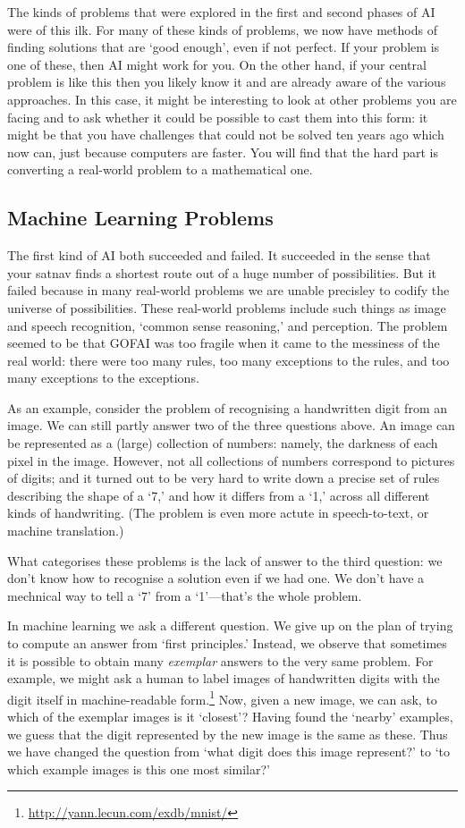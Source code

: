 \documentclass[10pt, a4paper, twocolumn]{article}
\begin{document}
The kinds of problems that were explored in the first and second phases of AI
were of this ilk. For many of these kinds of problems, we now have methods of
finding solutions that are `good enough', even if not perfect. If your problem
is one of these, then AI might work for you. On the other hand, if your central
problem is like this then you likely know it and are already aware of the
various approaches. In this case, it might be interesting to look at other
problems you are facing and to ask whether it could be possible to cast them
into this form: it might be that you have challenges that could not be solved
ten years ago which now can, just because computers are faster. You will find
that the hard part is converting a real-world problem to a mathematical one.


\subsection{Machine Learning Problems}

The first kind of AI both succeeded and failed. It succeeded in the sense that
your satnav finds a shortest route out of a huge number of possibilities. But it
failed because in many real-world problems we are unable precisley to codify the
universe of possibilities. These real-world problems include such things as
image and speech recognition, `common sense reasoning,' and perception. The
problem seemed to be that GOFAI was too fragile when it came to the messiness of
the real world: there were too many rules, too many exceptions to the rules, and
too many exceptions to the exceptions.

As an example, consider the problem of recognising a handwritten digit from an
image. We can still partly answer two of the three questions above. An image can
be represented as a (large) collection of numbers: namely, the darkness of each
pixel in the image. However, not all collections of numbers correspond to
pictures of digits; and it turned out to be very hard to write down a precise
set of rules describing the shape of a `7,' and how it differs from a `1,'
across all different kinds of handwriting. (The problem is even more actute in
speech-to-text, or machine translation.)

What categorises these problems is the lack of answer to the third question: we
don't know how to recognise a solution even if we had one. We don't have a
mechnical way to tell a `7' from a `1'---that's the whole problem.

In machine learning we ask a different question. We give up on the plan of
trying to compute an answer from `first principles.' Instead, we observe that
sometimes it is possible to obtain many \emph{exemplar} answers to the very same
problem. For example, we might ask a human to label images of handwritten digits
with the digit itself in machine-readable
form.\footnote{\url{http://yann.lecun.com/exdb/mnist/}} Now, given a new image,
we can ask, to which of the exemplar images is it `closest'? Having found the
`nearby' examples, we guess that the digit represented by the new image is the
same as these. Thus we have changed the question from `what digit does this
image represent?' to `to which example images is this one most similar?'
\end{document}
